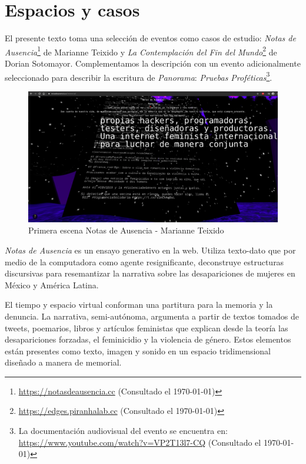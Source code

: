 
\section*{Espacios y casos} %

El presente texto toma una selección de eventos como casos de estudio: \textit{Notas de Ausencia}\footnote{\url{https://notasdeausencia.cc} (Consultado el \today)} de Marianne Teixido y \textit{La Contemplación del Fin del Mundo}\footnote{\url{https://edges.piranhalab.cc} (Consultado el \today)} de Dorian Sotomayor. Complementamos la descripción con un evento adicionalmente seleccionado para describir la escritura de \textit{Panorama}: \textit{Pruebas Proféticas}\footnote{La documentación audiovisual del evento se encuentra en: \url{https://www.youtube.com/watch?v=VP2T13l7-CQ} (Consultado el \today)}. %

\begin{figure}
  \includegraphics[width=\textwidth]{img/notas02.png}
  \caption{Primera escena Notas de Ausencia - Marianne Teixido}
\end{figure}


\textit{Notas de Ausencia} \citep{notasdeausencia} es un ensayo generativo en la web. Utiliza texto-dato que por medio de la computadora como agente resignificante, deconstruye estructuras discursivas para resemantizar la narrativa sobre las desapariciones de mujeres en México y América Latina.

El tiempo y espacio virtual conforman una partitura para la memoria y la denuncia. La narrativa, semi-autónoma, argumenta a partir de textos tomados de tweets, poemarios, libros y artículos feministas que explican desde la teoría las desapariciones forzadas, el feminicidio y la violencia de género. Estos elementos están presentes como texto, imagen y sonido en un espacio tridimensional diseñado a manera de memorial.

